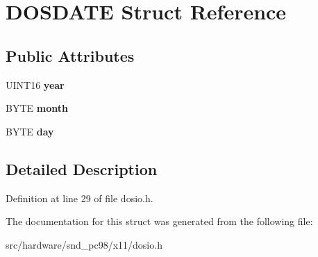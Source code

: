 \hypertarget{structDOSDATE}{\section{D\-O\-S\-D\-A\-T\-E Struct Reference}
\label{structDOSDATE}
}
\subsection*{Public Attributes}
\begin{DoxyCompactItemize}
\item 
\hypertarget{structDOSDATE_a2d21e0e617b98af76d3473a558d613d2}{U\-I\-N\-T16 {\bfseries year}}\label{structDOSDATE_a2d21e0e617b98af76d3473a558d613d2}

\item 
\hypertarget{structDOSDATE_a4b019062dff834cd7f3f7b0c9c88c90e}{B\-Y\-T\-E {\bfseries month}}\label{structDOSDATE_a4b019062dff834cd7f3f7b0c9c88c90e}

\item 
\hypertarget{structDOSDATE_a068af5c8e70cd66d5a1ef3e7fc8a9b86}{B\-Y\-T\-E {\bfseries day}}\label{structDOSDATE_a068af5c8e70cd66d5a1ef3e7fc8a9b86}

\end{DoxyCompactItemize}


\subsection{Detailed Description}


Definition at line 29 of file dosio.\-h.



The documentation for this struct was generated from the following file\-:\begin{DoxyCompactItemize}
\item 
src/hardware/snd\-\_\-pc98/x11/dosio.\-h\end{DoxyCompactItemize}
